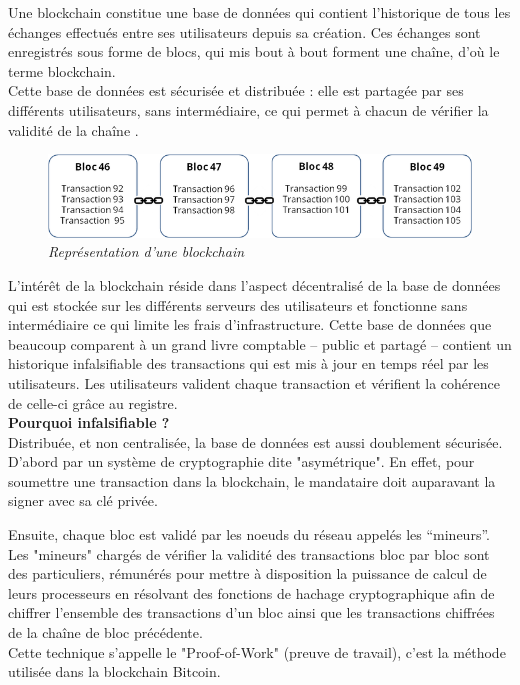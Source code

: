\documentclass[conference]{IEEEtran}
\begin{document}
Une blockchain constitue une base de données qui contient l’historique de tous les échanges effectués entre ses utilisateurs depuis sa création. Ces échanges sont enregistrés sous forme de blocs, qui mis bout à bout forment une chaîne, d'où le terme blockchain. \\Cette base de données est sécurisée et distribuée : elle est partagée par ses différents utilisateurs, sans intermédiaire, ce qui permet à chacun de vérifier la validité de la chaîne \cite{bcfr}.

\begin{figure}[!h]
    \centering
    \includegraphics[scale=0.55]{blck-schema.png}
    \caption{\textit{Représentation d'une blockchain \cite{bcfr}}}
    \label{fig:blockchain}
\end{figure}
\vspace{0.2cm}

L’intérêt de la blockchain réside dans l’aspect décentralisé de la base de données qui est stockée sur les différents serveurs des utilisateurs et fonctionne sans intermédiaire ce qui limite les frais d’infrastructure. Cette base de données que beaucoup comparent à un grand livre comptable – public et partagé – contient un historique infalsifiable des transactions qui est mis à jour en temps réel par les utilisateurs. Les utilisateurs valident chaque transaction et vérifient la cohérence de celle-ci grâce au registre. \\

\textbf{Pourquoi infalsifiable ? } \\
Distribuée, et non centralisée, la base de données est aussi doublement sécurisée. D'abord par un système de cryptographie dite "asymétrique". En effet, pour soumettre une transaction dans la blockchain, le mandataire doit auparavant la signer avec sa clé privée.

Ensuite, chaque bloc est validé par les noeuds du réseau appelés les “mineurs”. Les "mineurs" chargés de vérifier la validité des transactions bloc par bloc sont des particuliers, rémunérés pour mettre à disposition la puissance de calcul de leurs processeurs en résolvant des fonctions de hachage cryptographique afin de chiffrer l'ensemble des transactions d'un bloc ainsi que les transactions chiffrées de la chaîne de bloc précédente. \\Cette technique s'appelle le "Proof-of-Work" (preuve de travail), c'est la méthode utilisée dans la blockchain Bitcoin\cite{7x7, PoW}. \\
\end{document}
